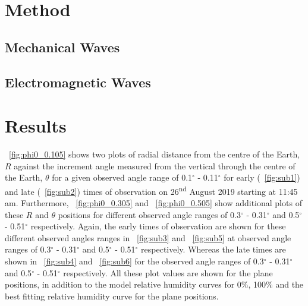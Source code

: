 \documentclass{article}
\newcommand{\figref}[2][\figurename~]{#1\ref{#2}}
\begin{document}
\section{Method}
\label{sec:method}

\subsection{Mechanical Waves}
\label{ssec:ripple-method}


\subsection{Electromagnetic Waves}
\label{ssec:diffraction-method}


\section{Results}


\figref{fig:phi0_0.105} shows two plots of radial distance from the centre of the Earth, $R$ against the increment angle measured from the vertical through the centre of the Earth, $\theta$ for a given observed angle range of 0.1$^{\circ}$ - 0.11$^{\circ}$ for early (\figref{fig:sub1}) and late (\figref{fig:sub2}) times of observation on 26\textsuperscript{nd} August 2019 starting at 11:45 am. Furthermore, \figref{fig:phi0_0.305} and \figref{fig:phi0_0.505} show additional plots of these $R$ and $\theta$ positions for different observed angle ranges of 0.3$^{\circ}$ - 0.31$^{\circ}$ and 0.5$^{\circ}$ - 0.51$^{\circ}$ respectively. Again, the early times of observation are shown for these different observed angles ranges in \figref{fig:sub3} and \figref{fig:sub5} at observed angle ranges of 0.3$^{\circ}$ - 0.31$^{\circ}$ and 0.5$^{\circ}$ - 0.51$^{\circ}$ respectively. Whereas the late times are shown in \figref{fig:sub4} and \figref{fig:sub6} for the observed angle ranges of 0.3$^{\circ}$ - 0.31$^{\circ}$ and 0.5$^{\circ}$ - 0.51$^{\circ}$ respectively. All these plot values are shown for the plane positions, in addition to the model relative humidity curves for 0$\%$, 100$\%$ and the best fitting relative humidity curve for the plane positions.
\end{document}
